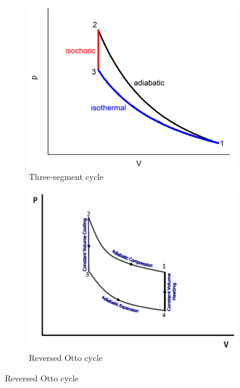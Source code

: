 \documentclass{scrartcl}
\begin{document}
\begin{figure}[!ht]
     \centering
     \begin{subfigure}[b]{0.45\textwidth}
         \centering
         \includegraphics[width=\textwidth]{3seg_pic.png}
         \caption{Three-segment cycle}
         \label{fig:3seg pic}
     \end{subfigure}
     \hfill
     \begin{subfigure}[b]{0.45\textwidth}
         \centering
         \includegraphics[width=\textwidth]{Otto_pic.png}
         \caption{Reversed Otto cycle}
         \label{fig:Otto pic}
     \end{subfigure}
\end{figure}
\FloatBarrier
\end{document}

